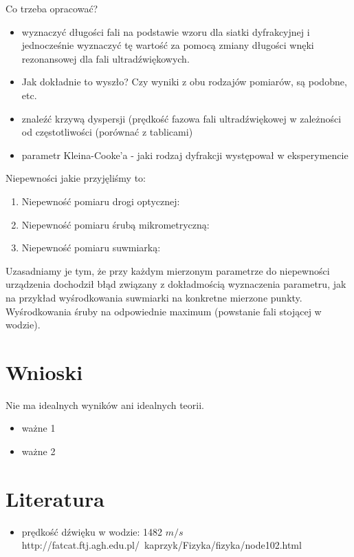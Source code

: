 \documentclass[a4paper,12pt]{article}
\begin{document}
Co trzeba opracować?
\begin{itemize}
\item wyznaczyć długości fali na podstawie wzoru dla siatki dyfrakcyjnej i jednocześnie wyznaczyć tę wartość za pomocą zmiany długości wnęki rezonansowej dla fali ultradźwiękowych.

\item Jak dokładnie to wyszło? Czy wyniki z obu rodzajów pomiarów, są podobne, etc.

\item znaleźć krzywą dyspersji (prędkość fazowa fali ultradźwiękowej w zależności od częstotliwości (porównać z tablicami)

\item parametr Kleina-Cooke'a - jaki rodzaj dyfrakcji występował w eksperymencie
\end{itemize}

Niepewności jakie przyjęliśmy to:
\begin{enumerate}
  \item Niepewność pomiaru drogi optycznej: 
  \item Niepewność pomiaru śrubą mikrometryczną:
  \item Niepewność pomiaru suwmiarką: 
  
\end{enumerate}

Uzasadniamy je tym, że przy każdym mierzonym parametrze do niepewności urządzenia dochodził błąd związany z dokładmością wyznaczenia parametru, jak na przykład wyśrodkowania suwmiarki na konkretne mierzone punkty. Wyśrodkowania śruby na odpowiednie maximum (powstanie fali stojącej w wodzie). 



\section{Wnioski}

Nie ma idealnych wyników ani idealnych teorii.

\begin{itemize}
  \item ważne 1
  \item ważne 2
  
\end{itemize}

\section {Literatura}
  
 \begin{itemize}
   \item prędkość dźwięku w wodzie: 1482 $m/s$ \\ http://fatcat.ftj.agh.edu.pl/~kaprzyk/Fizyka/fizyka/node102.html
   
 \end{itemize}
\end{document}
